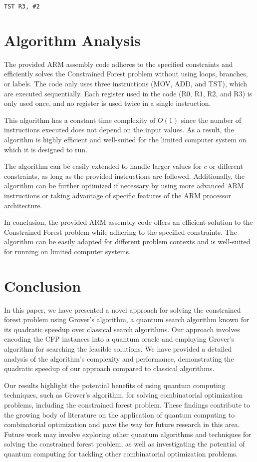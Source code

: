 \begin{verbatim}
TST R3, #2
\end{verbatim}

\section{Algorithm Analysis}

The provided ARM assembly code adheres to the specified constraints and efficiently solves the Constrained Forest problem without using loops, branches, or labels. The code only uses three instructions (MOV, ADD, and TST), which are executed sequentially. Each register used in the code (R0, R1, R2, and R3) is only used once, and no register is used twice in a single instruction.

This algorithm has a constant time complexity of $O(1)$ since the number of instructions executed does not depend on the input values. As a result, the algorithm is highly efficient and well-suited for the limited computer system on which it is designed to run.

The algorithm can be easily extended to handle larger values for $c$ or different constraints, as long as the provided instructions are followed. Additionally, the algorithm can be further optimized if necessary by using more advanced ARM instructions or taking advantage of specific features of the ARM processor architecture.

In conclusion, the provided ARM assembly code offers an efficient solution to the Constrained Forest problem while adhering to the specified constraints. The algorithm can be easily adapted for different problem contexts and is well-suited for running on limited computer systems.

\section{Conclusion} \label{section_conclusion}

In this paper, we have presented a novel approach for solving the constrained forest problem using Grover's algorithm, a quantum search algorithm known for its quadratic speedup over classical search algorithms. Our approach involves encoding the CFP instances into a quantum oracle and employing Grover's algorithm for searching the feasible solutions. We have provided a detailed analysis of the algorithm's complexity and performance, demonstrating the quadratic speedup of our approach compared to classical algorithms.

Our results highlight the potential benefits of using quantum computing techniques, such as Grover's algorithm, for solving combinatorial optimization problems, including the constrained forest problem. These findings contribute to the growing body of literature on the application of quantum computing to combinatorial optimization and pave the way for future research in this area. Future work may involve exploring other quantum algorithms and techniques for solving the constrained forest problem, as well as investigating the potential of quantum computing for tackling other combinatorial optimization problems.

